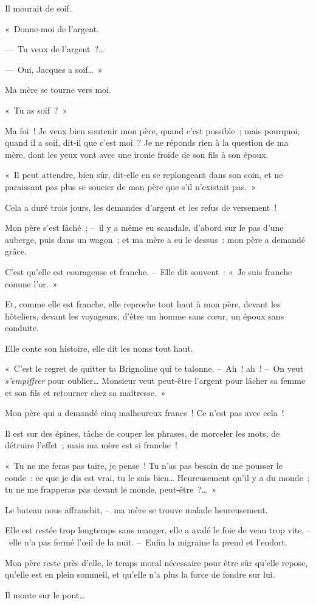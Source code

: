 \documentclass[french,twoside]{book} %
\def\mednobreak{\ifdim\lastskip<\medskipamount
  \removelastskip\nopagebreak\medskip\fi}
\newcommand{\labelblock}[1]{\medbreak{\noindent\color{rubric}\bfseries #1}\par\mednobreak}
\begin{document}
Il mourait de soif.\par
« Donne-moi de l’argent.\par
— Tu veux de l’argent ?…\par
— Oui, Jacques a soif… »\par
Ma mère se tourne vers moi.\par
« Tu as soif ? »\par
Ma foi ! Je veux bien soutenir mon père, quand c’est possible ; mais pourquoi, quand il a soif, dit-il que c’est moi ? Je ne réponds rien à la question de ma mère, dont les yeux vont avec une ironie froide de son fils à son époux.\par
« Il peut attendre, bien sûr, dit-elle en se replongeant dans son coin, et ne paraissant pas plus se soucier de mon père que s’il n’existait pas. »\par
\bigbreak
\noindent Cela a duré trois jours, les demandes d’argent et les refus de versement !\par
Mon père s’est fâché ; – il y a même eu scandale, d’abord sur le pas d’une auberge, puis dans un wagon ; et ma mère a eu le dessus : mon père a demandé grâce.\par
C’est qu’elle est courageuse et franche. – Elle dit souvent : « Je suis franche comme l’or. »\par
Et, comme elle est franche, elle reproche tout haut à mon père, devant les hôteliers, devant les voyageurs, d’être un homme sans cœur, un époux sans conduite.\par
Elle conte son histoire, elle dit les noms tout haut.\par
« C’est le regret de quitter ta Brignoline qui te talonne. – Ah ! ah ! – On veut\emph{ s’empiffrer} pour oublier… Monsieur veut peut-être l’argent pour lâcher sa femme et son fils et retourner chez sa maîtresse. »\par
\bigbreak
\noindent Mon père qui a demandé cinq malheureux francs ! Ce n’est pas avec cela !\par
Il est sur des épines, tâche de couper les phrases, de morceler les mots, de détruire l’effet ; mais ma mère est si franche !\par
« Tu ne me feras pas taire, je pense ! Tu n’as pas besoin de me pousser le coude : ce que je dis est vrai, tu le sais bien… Heureusement qu’il y a du monde ; tu ne me frapperas pas devant le monde, peut-être ?… »\par

\labelblock{SUR LE BATEAU}

\noindent Le bateau nous affranchit, – ma mère se trouve malade heureusement.\par
Elle est restée trop longtemps sans manger, elle a avalé le foie de veau trop vite, – elle n’a pas fermé l’œil de la nuit. – Enfin la migraine la prend et l’endort.\par
Mon père reste près d’elle, le temps moral nécessaire pour être sûr qu’elle repose, qu’elle est en plein sommeil, et qu’elle n’a plus la force de fondre sur lui.\par
Il monte sur le pont…\par
\end{document}

